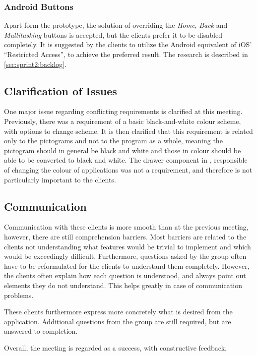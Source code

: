 \subsubsection{Android Buttons}
Apart form the prototype, the solution of overriding the \textit{Home}, \textit{Back} and \textit{Multitasking} buttons is accepted, but the clients prefer it to be disabled completely.
It is suggested by the clients to utilize the Android equivalent of iOS' ``Restricted Access'', to achieve the preferred result.
The research is described in \cref{sec:sprint2:backlog}.

\subsection{Clarification of Issues}\label{sec:sprint2:clarification}
One major issue regarding conflicting requirements is clarified at this meeting.
Previously, there was a requirement of a basic black-and-white colour scheme, with options to change scheme.
It is then clarified that this requirement is related only to the pictograms and not to the program as a whole, meaning the pictogram should in general be black and white and those in colour should be able to be converted to black and white.
The drawer component in \launcher, responsible of changing the colour of applications was not a requirement, and therefore is not particularly important to the clients.

\subsection{Communication}
Communication with these clients is more smooth than at the previous meeting, however, there are still comprehension barriers.
Most barriers are related to the clients not understanding what features would be trivial to implement and which would be exceedingly difficult.
Furthermore, questions asked by the group often have to be reformulated for the clients to understand them completely.
However, the clients often explain how each question is understood, and always point out elements they do not understand.
This helps greatly in case of communication problems.

These clients furthermore express more concretely what is desired from the application.
Additional questions from the group are still required, but are answered to completion.

Overall, the meeting is regarded as a success, with constructive feedback.